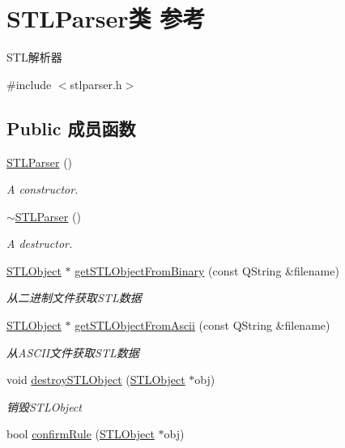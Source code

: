 \hypertarget{class_s_t_l_parser}{}\section{S\+T\+L\+Parser类 参考}
\label{class_s_t_l_parser}


S\+T\+L解析器  




{\ttfamily \#include $<$stlparser.\+h$>$}

\subsection*{Public 成员函数}
\begin{DoxyCompactItemize}
\item 
\hypertarget{class_s_t_l_parser_a4b39dafdc4c623d73dbbaf1a6bcc34f2}{}\hyperlink{class_s_t_l_parser_a4b39dafdc4c623d73dbbaf1a6bcc34f2}{S\+T\+L\+Parser} ()\label{class_s_t_l_parser_a4b39dafdc4c623d73dbbaf1a6bcc34f2}

\begin{DoxyCompactList}\small\item\em A constructor. \end{DoxyCompactList}\item 
\hypertarget{class_s_t_l_parser_a8f50c99d83216a3b694bf2265073466b}{}\hyperlink{class_s_t_l_parser_a8f50c99d83216a3b694bf2265073466b}{$\sim$\+S\+T\+L\+Parser} ()\label{class_s_t_l_parser_a8f50c99d83216a3b694bf2265073466b}

\begin{DoxyCompactList}\small\item\em A destructor. \end{DoxyCompactList}\item 
\hyperlink{struct_s_t_l_object}{S\+T\+L\+Object} $\ast$ \hyperlink{class_s_t_l_parser_a0f0e43e0c273778d41179b7026b6b878}{get\+S\+T\+L\+Object\+From\+Binary} (const Q\+String \&filename)
\begin{DoxyCompactList}\small\item\em 从二进制文件获取\+S\+T\+L数据 \end{DoxyCompactList}\item 
\hyperlink{struct_s_t_l_object}{S\+T\+L\+Object} $\ast$ \hyperlink{class_s_t_l_parser_a7873403451606116b50bc88325585e7b}{get\+S\+T\+L\+Object\+From\+Ascii} (const Q\+String \&filename)
\begin{DoxyCompactList}\small\item\em 从\+A\+S\+C\+I\+I文件获取\+S\+T\+L数据 \end{DoxyCompactList}\item 
void \hyperlink{class_s_t_l_parser_a0189d69e3d347e3ba9af2a06d08e7809}{destroy\+S\+T\+L\+Object} (\hyperlink{struct_s_t_l_object}{S\+T\+L\+Object} $\ast$obj)
\begin{DoxyCompactList}\small\item\em 销毁\+S\+T\+L\+Object \end{DoxyCompactList}\item 
bool \hyperlink{class_s_t_l_parser_a2e559f6f91f972c9b151593604a22002}{confirm\+Rule} (\hyperlink{struct_s_t_l_object}{S\+T\+L\+Object} $\ast$obj)
\end{DoxyCompactItemize}


